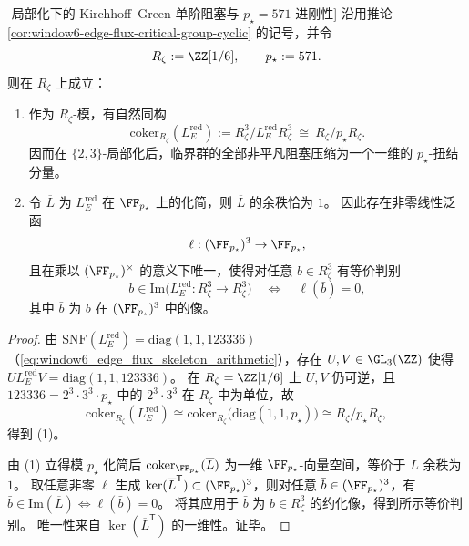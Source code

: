 \begin{theorem}[\(\ZZ[1/6]\)-局部化下的 Kirchhoff--Green 单阶阻塞与 \texorpdfstring{$p_\star=571$}{p*=571}-进刚性]\label{thm:window6-kirchhoff-green-single-order-padic-rigidity}
沿用推论 \ref{cor:window6-edge-flux-critical-group-cyclic} 的记号，并令
\[
R_\zeta:=\ZZ[1/6],
\qquad
p_\star:=571.
\]
则在 \(R_\zeta\) 上成立：
\begin{enumerate}
  \item 作为 \(R_\zeta\)-模，有自然同构
  \[
  \mathrm{coker}_{R_\zeta}(L_E^{\mathrm{red}})
  :=R_\zeta^{3}/L_E^{\mathrm{red}}R_\zeta^{3}
  \ \cong\
  R_\zeta/p_\star R_\zeta.
  \]
  因而在 \(\{2,3\}\)-局部化后，临界群的全部非平凡阻塞压缩为一个一维的 \(p_\star\)-扭结分量。
  \item 令 \(\overline L\) 为 \(L_E^{\mathrm{red}}\) 在 \(\FF_{p_\star}\) 上的化简，则 \(\overline L\) 的余秩恰为 \(1\)。
  因此存在非零线性泛函
  \[
  \ell:(\FF_{p_\star})^3\to \FF_{p_\star},
  \]
  且在乘以 \((\FF_{p_\star})^\times\) 的意义下唯一，使得对任意 \(b\in R_\zeta^3\) 有等价判别
  \[
  b\in \mathrm{Im}\bigl(L_E^{\mathrm{red}}:R_\zeta^3\to R_\zeta^3\bigr)
  \quad\Longleftrightarrow\quad
  \ell(\bar b)=0,
  \]
  其中 \(\bar b\) 为 \(b\) 在 \((\FF_{p_\star})^3\) 中的像。
\end{enumerate}
\end{theorem}

\begin{proof}
由 \(\mathrm{SNF}(L_E^{\mathrm{red}})=\mathrm{diag}(1,1,123336)\)（\eqref{eq:window6_edge_flux_skeleton_arithmetic}），存在 \(U,V\in \GL_3(\ZZ)\) 使得
\(
UL_E^{\mathrm{red}}V=\mathrm{diag}(1,1,123336)
\)。
在 \(R_\zeta=\ZZ[1/6]\) 上 \(U,V\) 仍可逆，且 \(123336=2^3\cdot 3^3\cdot p_\star\) 中的 \(2^3\cdot 3^3\) 在 \(R_\zeta\) 中为单位，故
\[
\mathrm{coker}_{R_\zeta}(L_E^{\mathrm{red}})
\cong
\mathrm{coker}_{R_\zeta}\!\bigl(\mathrm{diag}(1,1,p_\star)\bigr)
\cong
R_\zeta/p_\star R_\zeta,
\]
得到 (1)。
\par
由 (1) 立得模 \(p_\star\) 化简后 \(\mathrm{coker}_{\FF_{p_\star}}(\overline L)\) 为一维 \(\FF_{p_\star}\)-向量空间，等价于 \(\overline L\) 余秩为 \(1\)。
取任意非零 \(\ell\) 生成 \(\ker(\overline L^{\mathsf T})\subset (\FF_{p_\star})^3\)，则对任意 \(\bar b\in(\FF_{p_\star})^3\)，有
\(\bar b\in\mathrm{Im}(\overline L)\iff \ell(\bar b)=0\)。
将其应用于 \(\bar b\) 为 \(b\in R_\zeta^3\) 的约化像，得到所示等价判别。
唯一性来自 \(\ker(\overline L^{\mathsf T})\) 的一维性。证毕。
\end{proof}

